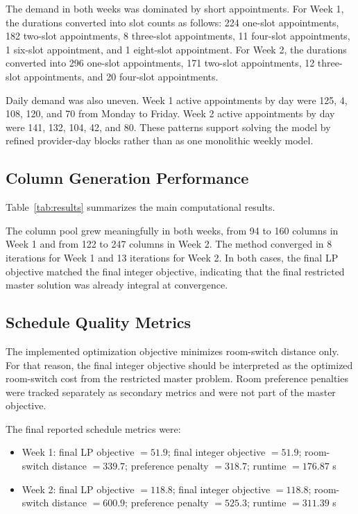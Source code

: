 \documentclass[12pt]{article}
\begin{document}
The demand in both weeks was dominated by short appointments. For Week 1, the durations
converted into slot counts as follows: 224 one-slot appointments, 182 two-slot appointments,
8 three-slot appointments, 11 four-slot appointments, 1 six-slot appointment, and 1 eight-slot
appointment. For Week 2, the durations converted into 296 one-slot appointments, 171 two-slot
appointments, 12 three-slot appointments, and 20 four-slot appointments.

Daily demand was also uneven. Week 1 active appointments by day were 125, 4, 108, 120,
and 70 from Monday to Friday. Week 2 active appointments by day were 141, 132, 104, 42, and
80. These patterns support solving the model by refined provider-day blocks rather than as one
monolithic weekly model.

\subsection*{Column Generation Performance}

Table~\ref{tab:results} summarizes the main computational results.

The column pool grew meaningfully in both weeks, from 94 to 160 columns in Week 1 and from
122 to 247 columns in Week 2. The method converged in 8 iterations for Week 1 and 13
iterations for Week 2. In both cases, the final LP objective matched the final integer objective,
indicating that the final restricted master solution was already integral at convergence.

\subsection*{Schedule Quality Metrics}

The implemented optimization objective minimizes room-switch distance only. For that reason,
the final integer objective should be interpreted as the optimized room-switch cost from the
restricted master problem. Room preference penalties were tracked separately as secondary
metrics and were not part of the master objective.

The final reported schedule metrics were:
\begin{itemize}
  \item Week 1: final LP objective $= 51.9$; final integer objective $= 51.9$; room-switch distance $= 339.7$; preference penalty $= 318.7$; runtime $= 176.87$ s
  \item Week 2: final LP objective $= 118.8$; final integer objective $= 118.8$; room-switch distance $= 600.9$; preference penalty $= 525.3$; runtime $= 311.39$ s
\end{itemize}
\end{document}
